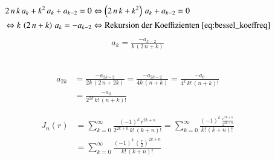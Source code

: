 \begin{align*}
	2 \, n \, k \, a_k
	+
	k^2 \, a_k
	+
	a_{k - 2}
	= 0
	&\Leftrightarrow
	\left(
	2 \, n \, k 
	+
	k^2 
	\right)
	\, a_k
	+
	a_{k - 2}
	= 0 \\
	\Leftrightarrow
	k \,
	\left(
	2 \, n
	+
	k
	\right)
	\, a_k
	= -a_{k - 2}
	&\Leftrightarrow
	\text{Rekursion der Koeffizienten \ref{eq:bessel_koeffreq}}
\end{align*}
\begin{align}
	a_k
	=
	\frac
	{
		-a_{k - 2}
	}{
		k \, \left( 2 \, n + k \right)	
	}
	\label{eq:bessel_koeffreq}
\end{align}
\\
\begin{normalsize}
	
\end{normalsize}
\begin{align}
	\nonumber
	a_{2k}
	&=
	\frac
	{
		-a_{2k - 2}
	}{
		2k \, \left( 2 \, n + 2k \right)	
	}
	=
	\frac
	{
		-a_{2k - 2}
	}{
		4k \, \left( n + k \right)	
	} 
	=
	\frac
	{
		-a_0
	}{
		4^k \, {k}! \, {\left( n + k \right)}!
	}\\
	&= 
	\frac
	{
		-a_0
	}{
		2^{2k} \, {k}! \, {\left( n + k \right)}!
	}
\end{align}


\begin{align}
	J_n \left( r \right)
	&= \nonumber
	\sum_{k=0} ^{\infty}
	\frac
	{
		\left( - 1 \right) ^k \, r ^{2k+n}
	}{
		2^{2k+n} \, {k}! \, { \left( k + n \right) }!
	}
	=
	\sum_{k=0} ^{\infty}
	\frac
	{
		\left( - 1 \right) ^k \, 
		\frac
		{
			r ^{2k+n}
		}{
			2^{2k+n}
		}
	}{
		{k}! \, { \left( k + n \right) }!
	} \\
	&=
	\sum_{k=0} ^{\infty}
	\frac
	{
		\left( - 1 \right) ^k \, 
		\left(		
		\frac
		{
			r
		}{
			2
		} \right) ^{2k+n}
	}{
		{k}! \, { \left( k + n \right) }!
	}
	\label{eq:bessel_summenformel}
\end{align}



